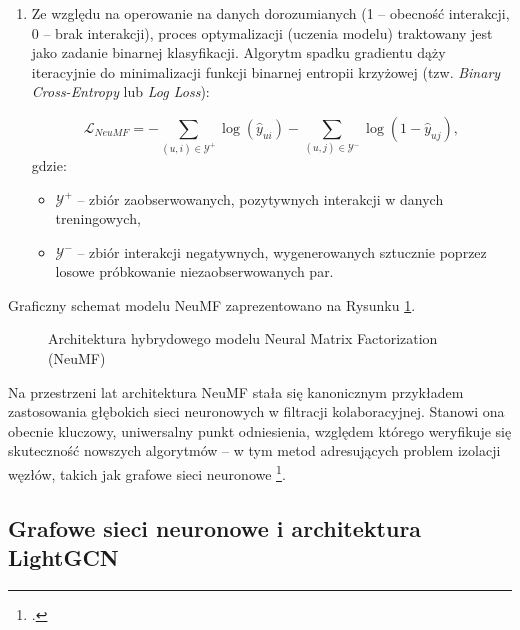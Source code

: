 \begin{enumerate}
    \item Ze względu na operowanie na danych dorozumianych (1 -- obecność interakcji, 0 -- brak interakcji), proces optymalizacji (uczenia modelu) traktowany jest jako zadanie binarnej klasyfikacji. Algorytm spadku gradientu dąży iteracyjnie do minimalizacji funkcji binarnej entropii krzyżowej (tzw. \textit{Binary Cross-Entropy} lub \textit{Log Loss}):

          \begin{equation}
              \mathcal{L}_{NeuMF} = - \sum_{(u,i) \in \mathcal{Y}^+} \log(\hat{y}_{ui}) - \sum_{(u,j) \in \mathcal{Y}^-} \log(1 - \hat{y}_{uj})
              \label{eq:neumf_loss},
          \end{equation}
          gdzie:
          \begin{itemize}
              \item $\mathcal{Y}^+$ -- zbiór zaobserwowanych, pozytywnych interakcji w danych treningowych,
              \item $\mathcal{Y}^-$ -- zbiór interakcji negatywnych, wygenerowanych sztucznie poprzez losowe próbkowanie niezaobserwowanych par.
          \end{itemize}
\end{enumerate}

Graficzny schemat modelu NeuMF zaprezentowano na Rysunku \ref{fig:neumf_architecture}.

\begin{figure}[H]
    \centering
    
    \caption{Architektura hybrydowego modelu Neural Matrix Factorization (NeuMF)}
    \label{fig:neumf_architecture}
    \vspace{0.2cm}
\end{figure}

Na przestrzeni lat architektura NeuMF stała się kanonicznym przykładem zastosowania głębokich sieci neuronowych w filtracji kolaboracyjnej. Stanowi ona obecnie kluczowy, uniwersalny punkt odniesienia, względem którego weryfikuje się skuteczność nowszych algorytmów -- w tym metod adresujących problem izolacji węzłów, takich jak grafowe sieci neuronowe \footcite[5]{heLightGCNSimplifyingPowering2020}.

\subsection{Grafowe sieci neuronowe i architektura LightGCN}

